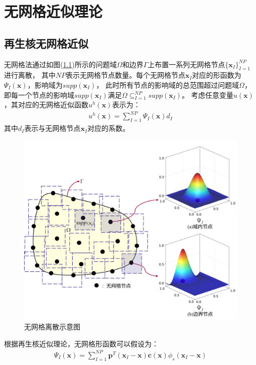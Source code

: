 \chapter{无网格近似理论}
\section{再生核无网格近似}
无网格法通过如图(\ref{nomeshpoint})所示的问题域$\Omega$和边界$\Gamma$上布置一系列无网格节点$\{\pmb{x}_I\}^{N\!P}_{I=1}$进行离散，
其中$N\!P$表示无网格节点数量。每个无网格节点$\pmb{x}_I$对应的形函数为$\Psi_I(\pmb{x})$，影响域为$supp(\pmb{x}_I)$，
此时所有节点的影响域的总范围超过问题域$\Omega$，即每一个节点的影响域$supp(\pmb{x}_I)$满足$\Omega\subseteq^{N\!P}_{I=1}supp(\pmb{x}_I)$。
考虑任意变量$u(\pmb{x})$，其对应的无网格近似函数$u^h(\pmb{x})$表示为：
\begin{equation}\label{ui}
\begin{split}
    u^h(\pmb{x})=\sum_{I=1}^{N\!P}\Psi_I(\pmb{x})d_{I}
\end{split}
\end{equation}
其中$d_{I}$表示与无网格节点$\pmb{x}_I$对应的系数。\par
\begin{figure}[H]
\centering
    \includegraphics[scale=0.6]{Figure/nomesh/point.png}
    \caption{无网格离散示意图}\label{nomeshpoint}
\end{figure}\par
根据再生核近似理论\cite{Liu}，无网格形函数可以假设为：
\begin{equation}\label{shapefunction}
\begin{split}
    \Psi_I(\pmb{x})=\sum_{I=1}^{N\!P}\pmb{p}^T(\pmb{x}_I-\pmb{x})\pmb{c}(\pmb{x})\phi_s(\pmb{x}_I-\pmb{x})
\end{split}
\end{equation}
